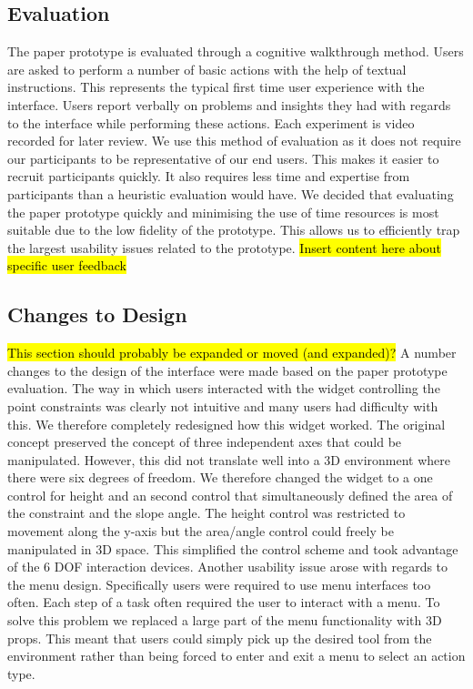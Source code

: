 \documentclass{article}
\begin{document}
\subsection{Evaluation}
The paper prototype is evaluated through a cognitive walkthrough method\cite{Bowman2002}. Users are asked to perform a number of basic actions with the help of textual instructions. This represents the typical first time user experience with the interface. Users report verbally on problems and insights they had with regards to the interface while performing these actions. Each experiment is video recorded for later review.
\newline\newline
We use this method of evaluation as it does not require our participants to be representative of our end users\cite{Bowman2002}. This makes it easier to recruit participants quickly. It also requires less time and expertise from participants than a heuristic evaluation would have. We decided that evaluating the paper prototype quickly and minimising the use of time resources is most suitable due to the low fidelity of the prototype. This allows us to efficiently trap the largest usability issues related to the prototype.
\newline\newline
\hl{Insert content here about specific user feedback}



\subsection{Changes to Design}
\hl{This section should probably be expanded or moved (and expanded)?}
\newline\newline
A number changes to the design of the interface were made based on the paper prototype evaluation.
\newline\newline
The way in which users interacted with the widget controlling the point constraints was clearly not intuitive and many users had difficulty with this. We therefore completely redesigned how this widget worked. The original concept preserved the concept of three independent axes that could be manipulated. However, this did not translate well into a 3D environment where there were six degrees of freedom. We therefore changed the widget to a one control for height and an second control that simultaneously defined the area of the constraint and the slope angle. The height control was restricted to movement along the y-axis but the area/angle control could freely be manipulated in 3D space. This simplified the control scheme and took advantage of the 6 DOF interaction devices.
\newline\newline
Another usability issue arose with regards to the menu design. Specifically users were required to use menu interfaces too often. Each step of a task often required the user to interact with a menu. To solve this problem we replaced a large part of the menu functionality with 3D props. This meant that users could simply pick up the desired tool from the environment rather than being forced to enter and exit a menu to select an action type.
\newpage
\end{document}
